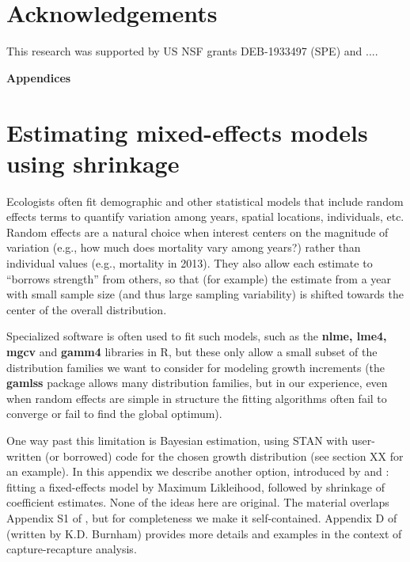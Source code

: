 \documentclass[11pt]{article}
\begin{document}
{\begin{enumerate}
\end{enumerate} 




\section*{Acknowledgements} 
This research was supported by US NSF grants DEB-1933497 (SPE) and .... 

%



\newpage 
\clearpage 
\setcounter{equation}{0}
\setcounter{figure}{0}
\setcounter{section}{0}
\setcounter{table}{0}
\setcounter{Box}{0}
\renewcommand{\theequation}{S.\arabic{equation}}
\renewcommand{\thetable}{S-\arabic{table}}
\renewcommand{\thefigure}{S-\arabic{figure}}
\renewcommand{\theBox}{S-\arabic{Box}}
\renewcommand{\thesection}{S.\arabic{section}}

\centerline{\Large{\textbf{Appendices}}}

\section{Estimating mixed-effects models using shrinkage}

Ecologists often fit demographic and other statistical models that include random effects terms to
quantify variation among years, spatial locations, individuals, etc. Random effects
are a natural choice when interest centers on the magnitude of variation (e.g., how much does mortality vary among years?)  
rather than individual values (e.g., mortality in 2013). They also allow each estimate to 
``borrows strength'' from others, so that (for example) the estimate from a year with small sample size (and thus large 
sampling variability) is shifted towards the center of the overall distribution. 

Specialized software is often used to fit such models, such as the \textbf{nlme, lme4, mgcv} and \textbf{gamm4} libraries in R,  
but these only allow a small subset of the distribution families we want to consider for modeling growth increments (the \textbf{gamlss} 
package allows many distribution families, but in our experience, even when random effects are simple in structure 
the fitting algorithms often fail to converge or fail to find the global optimum). 

One way past this limitation is Bayesian estimation, using STAN with user-written (or borrowed) 
code for the chosen growth distribution (see section XX for an example). 
In this appendix we describe another option, introduced by \citet{link-nichols-1994} and \citet{gould-nichols-1998}: 
fitting a fixed-effects model by Maximum Likleihood, followed by shrinkage of coefficient estimates. 
None of the ideas here are original. The material overlaps Appendix S1 of \citet{metcalf-etal-2015}, 
but for completeness we make it self-contained. Appendix D of \citet{cooch-white-2020} (written by K.D. Burnham)
provides more details and examples in the context of capture-recapture analysis. 

}
\end{document}
